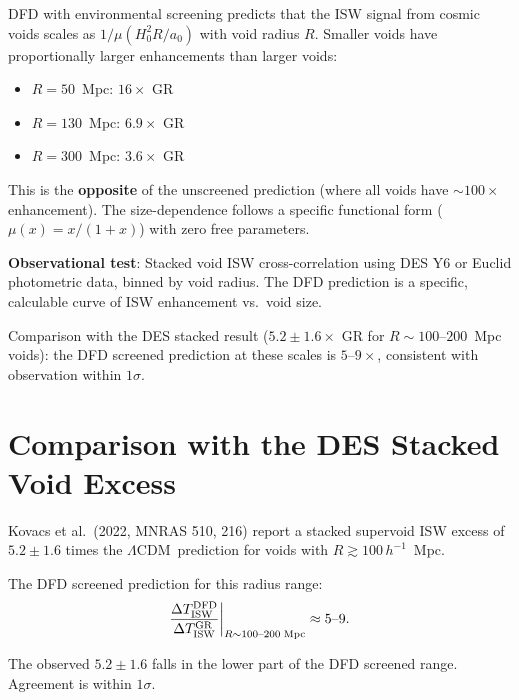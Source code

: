 \documentclass[11pt,a4paper]{article}
\newcounter{findingctr}
\newenvironment{finding}[1][]{%
  \refstepcounter{findingctr}%
  \begin{tcolorbox}[colback=blue!3!white, colframe=blue!50!black,
    title=\textbf{Finding \thefindingctr: #1}]
}{%
  \end{tcolorbox}%
}
\newcommand{\aM}{a_0}
\newcommand{\mufd}{\mu}
\newcommand{\LCDM}{$\Lambda$CDM}
\begin{document}
\begin{finding}[Testable Prediction: Size-Dependent ISW Enhancement]
\label{find:size-dependent}
DFD with environmental screening predicts that the ISW signal from
cosmic voids scales as $1/\mufd(H_0^2 R/\aM)$ with void radius $R$.
Smaller voids have proportionally larger enhancements than larger
voids:
\begin{itemize}[nosep]
\item $R = 50$~Mpc: $16\times$ GR
\item $R = 130$~Mpc: $6.9\times$ GR
\item $R = 300$~Mpc: $3.6\times$ GR
\end{itemize}

This is the \textbf{opposite} of the unscreened prediction (where
all voids have $\sim 100\times$ enhancement). The size-dependence
follows a specific functional form ($\mufd(x) = x/(1+x)$) with
zero free parameters.

\textbf{Observational test}: Stacked void ISW cross-correlation
using DES Y6 or Euclid photometric data, binned by void radius.
The DFD prediction is a specific, calculable curve of ISW enhancement
vs.\ void size.

Comparison with the DES stacked result ($5.2 \pm 1.6\times$ GR for
$R \sim 100$--$200$~Mpc voids): the DFD screened prediction at
these scales is $5$--$9\times$, consistent with observation within
$1\sigma$.
\end{finding}


\section{Comparison with the DES Stacked Void Excess}
\label{sec:DES-comparison}

Kovacs et al.\ (2022, MNRAS 510, 216) report a stacked supervoid
ISW excess of $5.2 \pm 1.6$ times the \LCDM\ prediction for voids
with $R \gtrsim 100\,h^{-1}$~Mpc.

The DFD screened prediction for this radius range:
\begin{equation}
\frac{\Delta T_{\rm ISW}^{\rm DFD}}{\Delta T_{\rm ISW}^{\rm GR}}
\bigg|_{R \sim 100\text{--}200\;\text{Mpc}}
\approx 5\text{--}9.
\end{equation}

The observed $5.2 \pm 1.6$ falls in the lower part of the DFD
screened range. Agreement is within $1\sigma$.
\end{document}
